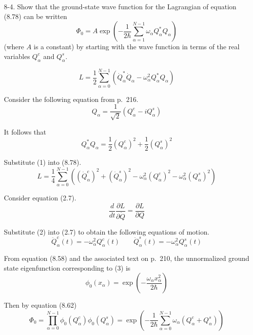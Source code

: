 \documentclass[12pt]{article}
\begin{document}
8-4.
Show that the ground-state wave function for the Lagrangian of
equation (8.78) can be written
\begin{equation*}
\Phi_0=A\exp\left(
-\frac{1}{2\hbar}
\sum_{\alpha=1}^{N-1}
\omega_\alpha Q_\alpha^*Q_\alpha
\right)
\tag{8.83}
\end{equation*}
(where $A$ is a constant) by starting with the wave function in terms of
the real variables $Q_\alpha^c$ and $Q_\alpha^s$.

\begin{equation*}
L=\frac{1}{2}\sum_{\alpha=0}^{N-1}
\left(\dot Q_\alpha^*\dot Q_\alpha-\omega_\alpha^2Q_\alpha^*Q_\alpha\right)
\tag{8.78}
\end{equation*}

Consider the following equation from p.~216.
\begin{equation*}
Q_\alpha=\frac{1}{\sqrt2}(Q_\alpha^c-iQ_\alpha^s)
\end{equation*}

It follows that
\begin{equation*}
Q_\alpha^*Q_\alpha
=\frac{1}{2}(Q_\alpha^c)^2+\frac{1}{2}(Q_\alpha^s)^2
\tag{1}
\end{equation*}

Substitute (1) into (8.78).
\begin{equation*}
L=\frac{1}{4}\sum_{\alpha=0}^{N-1}
\left(
(\dot Q_\alpha^c)^2
+(\dot Q_\alpha^s)^2
-\omega_\alpha^2(Q_\alpha^c)^2
-\omega_\alpha^2(Q_\alpha^s)^2
\right)
\tag{2}
\end{equation*}

Consider equation (2.7).
\begin{equation*}
\frac{d}{dt}\frac{\partial L}{\partial\dot Q}=\frac{\partial L}{\partial Q}
\tag{2.7}
\end{equation*}

Substitute (2) into (2.7) to obtain the following equations of motion.
\begin{equation*}
\ddot Q_\alpha^c(t)=-\omega_\alpha^2Q_\alpha^c(t)
\qquad
\ddot Q_\alpha^s(t)=-\omega_\alpha^2Q_\alpha^s(t)
\tag{3}
\end{equation*}

From equation (8.58) and the associated text on p.~210,
the unnormalized ground state eigenfunction corresponding to (3) is
\begin{equation*}
\phi_0(x_\alpha)=\exp\left(-\frac{\omega_\alpha x_\alpha^2}{2\hbar}\right)
\end{equation*}

Then by equation (8.62)
\begin{equation*}
\Phi_0=\prod_{\alpha=0}^{N-1}\phi_0(Q_\alpha^c)\phi_0(Q_\alpha^s)
=\exp\left(-\frac{1}{2\hbar}\sum_{\alpha=0}^{N-1}\omega_\alpha(Q_\alpha^c+Q_\alpha^s)\right)
\end{equation*}
\end{document}
